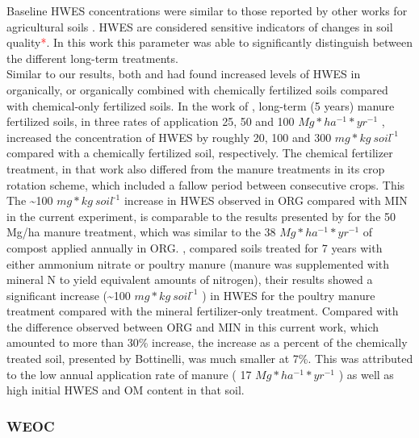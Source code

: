 \documentclass[12pt]{report}
\newcommand{\myRed}[1]{\textcolor{red}{#1}} %
\newlength{\SpaceAfterUnit}
\newcommand{\genericunit}{$ mg * kg\ soil^{\text{-}1}$ \hspace*{\SpaceAfterUnit}}
\begin{document}
			Baseline HWES concentrations were similar to those reported by other works for agricultural soils \citep{haynes2005, yousefi2008, puget1998}. HWES are considered sensitive indicators of changes in soil quality\myRed{*}. In this work this parameter was able to significantly distinguish between the different long-term treatments.\\
			Similar to our results, both \citet{yousefi2008} and \citet{bottinelli2017} had found increased levels of HWES in organically, or organically combined with chemically fertilized soils compared with chemical-only fertilized soils.
			In the work of \citet{yousefi2008}, long-term (5 years) manure fertilized soils, in three rates of application  25, 50 and 100 $ Mg * ha^{-1} * yr^{-1}  $ , increased the concentration of HWES by roughly 20, 100 and 300 \genericunit compared with a chemically fertilized soil, respectively. The chemical fertilizer treatment, in that work also differed from the manure treatments in its crop rotation scheme, which included a fallow period between consecutive crops. This The \~{}100 \genericunit increase in HWES observed in ORG compared with MIN in the current experiment, is comparable to the results presented by \citeauthor{yousefi2008} for the 50 Mg/ha manure treatment, which was similar to the 38 $ Mg * ha^{-1} * yr^{-1}  $ of compost applied annually in ORG.
			\citet{bottinelli2017}, compared soils treated for 7 years with either ammonium nitrate or poultry manure (manure was supplemented with mineral N to yield equivalent amounts of nitrogen), their results  showed a significant increase (\~{}100 \genericunit) in HWES for the poultry manure treatment compared with the mineral fertilizer-only treatment.
			Compared with the difference observed between ORG and MIN in this current work, which amounted to more than 30\% increase, the increase as a percent of the  chemically treated soil, presented by Bottinelli, was much smaller at 7\%. This was attributed to the low annual application rate of manure ( 17 $ Mg * ha^{-1} * yr^{-1}  $ ) as well as high initial HWES and OM content in that soil.
			
		\subsubsection{WEOC}
		
\end{document}
